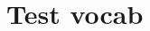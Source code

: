 \documentclass[a4paper,12pt]{report}
\begin{document}
\pagestyle{plain}


\chapter{Test vocab}

\begin{multicols*}{2}
  \section{}

  \columnbreak
  \section{}

\end{multicols*}
\end{document}
